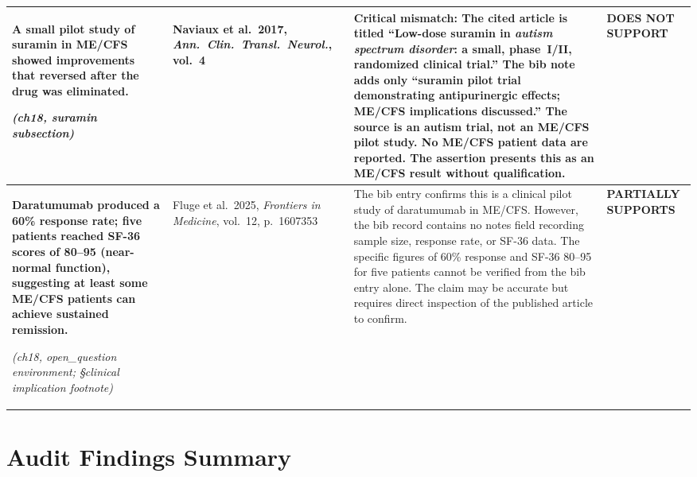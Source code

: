 \begin{longtable}{p{4.2cm}p{2.8cm}p{5.2cm}p{2.2cm}}
\raggedright
\textbf{A small pilot study of suramin in ME/CFS showed improvements that
reversed after the drug was eliminated.}
\par\smallskip\textit{(ch18, suramin subsection)}
&
\cite{Naviaux2018suraminpilot}\par\smallskip
Naviaux et al.\ 2017, \textit{Ann.\ Clin.\ Transl.\ Neurol.}, vol.~4
&
\textbf{Critical mismatch:} The cited article is titled ``Low-dose
suramin in \emph{autism spectrum disorder}: a small, phase~I/II,
randomized clinical trial.''  The bib note adds only ``suramin pilot
trial demonstrating antipurinergic effects; ME/CFS implications
discussed.''  The source is an autism trial, not an ME/CFS pilot
study.  No ME/CFS patient data are reported.  The assertion presents
this as an ME/CFS result without qualification.
&
\textbf{DOES NOT SUPPORT}\\
\midrule

\raggedright
\textbf{Daratumumab produced a 60\% response rate; five patients reached
SF-36 scores of 80--95 (near-normal function), suggesting at least
some ME/CFS patients can achieve sustained remission.}
\par\smallskip\textit{(ch18, open\_question environment; \S{}clinical
implication footnote)}
&
\cite{Fluge2025daratumumab}\par\smallskip
Fluge et al.\ 2025, \textit{Frontiers in Medicine}, vol.~12, p.~1607353
&
The bib entry confirms this is a clinical pilot study of daratumumab
in ME/CFS.  However, the bib record contains no notes field
recording sample size, response rate, or SF-36 data.  The specific
figures of 60\% response and SF-36 80--95 for five patients cannot
be verified from the bib entry alone.  The claim may be accurate but
requires direct inspection of the published article to confirm.
&
\textbf{PARTIALLY SUPPORTS}\\

\end{longtable}

\section*{Audit Findings Summary}


